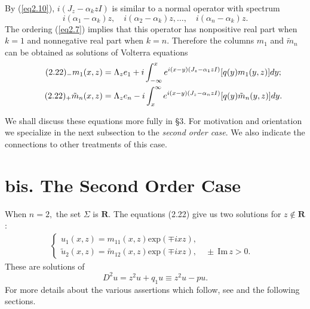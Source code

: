 \documentclass{surv-l}
\theoremstyle{plain}
\theoremstyle{definition}
\numberwithin{equation}{chapter}
\begin{document}
By (\ref{eq2.10}), $i(J_{z}-\alpha_{k}zI)$ is similar to a normal operator with spectrum
\begin{equation*}
i(\alpha_{1}-\alpha_{k})z,\quad i(\alpha_{2}-\alpha_{k})z, \ldots,\quad i(\alpha_{n}-\alpha_{k})z.
\end{equation*}
The ordering (\ref{eq2.7}) implies that this operator has nonpositive real part when $k=1$ and nonnegative real part when $k=n$. Therefore the columns $m_{1}$ and $\tilde{m}_{n}$ can be obtained as solutions of Volterra equations
\begin{align*}\label{eq2.22-}
\tag*{$(2.22)_{-}$} m_{1}(x,z)&=\Lambda_{z}e_{1}+i\int_{-\infty}^{x} e^{i(x-y)(J_{z}-\alpha_{1}zI)}[q(y)m_{1}(y,z)]dy;\\
\tag*{$(2.22)_{+}$} \tilde{m}_{n}(x,z)&=\Lambda_{z}e_{n}-i\int_{x}^{\infty} e^{i(x-y)(J_{z}-\alpha_{n}zI)}[q(y)\tilde{m}_{n}(y,z)]dy.
\end{align*}

We shall discuss these equations more fully in \S3. For motivation and orientation we specialize in the next subsection to the \emph{second order case}. We also indicate the connections to other treatments of this case.

\setcounter{section}{1}
\section{bis. The Second Order Case}
When $n=2,$ the set $\Sigma$ is $\mathbf{R}$. The equations (2.22) give us two solutions for $z\notin \mathbf{R}$: 
\setcounter{equation}{22}
\begin{align}\label{eq2.23}
\left\{\begin{array}{ll}u_{1}(x,z)=m_{11}(x,z)\mathrm{exp}(\mp ixz),&\\
\tilde{u}_{2}(x,z)=\tilde{m}_{12}(x,z)\mathrm{exp}(\mp ixz),\quad \pm\ \mathrm{Im}\,z> 0.
\end{array}\right.
\end{align}
These are solutions of
\begin{equation}\label{eq2.24}
D^{2}u=z^{2}u+q_{1}u\equiv z^{2}u-pu.
\end{equation}
For more details about the various assertions which follow, see \cite{DT, Fa1} and the following sections.
\end{document}
